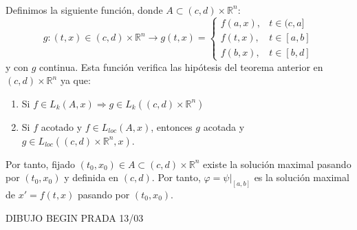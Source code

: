 \documentclass{article}
\makeatletter
\theoremstyle{theorem-style}  %
\theoremstyle{definition-style}
\theoremstyle{example-style}
\renewenvironment{proof}[1][\proofname]{\par
	\pushQED{\qed}%
	\normalfont \topsep6\p@\@plus6\p@\relax
	\list{}{%
		\settowidth{\leftmargin}{\quad:\hskip\labelsep}%
		\setlength{\labelwidth}{0pt}%
		\setlength{\itemindent}{-\leftmargin}%
	}%
	\item[\hskip\labelsep\itshape#1\@addpunct{:}]\ignorespaces
}{%
	\popQED\endlist\@endpefalse
}
\makeatother
\begin{document}
\begin{proof}\ \\
	Definimos la siguiente función, donde $A \subset (c, d) \times \mathbb{R}^n$:
	\[g: (t, x) \in (c, d) \times \mathbb{R}^n \longrightarrow g(t, x) = \begin{cases}
	f(a, x), &t \in (c, a] \\
	f(t, x), &t \in [a, b] \\
	f(b, x), &t \in [b, d] 
	\end{cases}\]
	y con $g$ continua. Esta función verifica las hipótesis del teorema anterior en $(c, d) \times \mathbb{R}^n$ ya que:
	\begin{enumerate}[-]
		\item Si $f \in L_k(A, x) \Rightarrow g \in L_k ((c, d) \times \mathbb{R}^n)$
		\item Si $f$ acotado y $f \in L_{loc} (A, x)$, entonces $g$ acotada y $g \in L_{loc} ((c, d) \times \mathbb{R}^n, x)$.
	\end{enumerate}
	Por tanto, fijado $(t_0, x_0) \in A \subset (c, d) \times \mathbb{R}^n$ existe la solución maximal pasando por $(t_0, x_0)$ y definida en $(c, d)$. Por tanto, $\varphi = \psi|_{[a, b]}$ es la solución maximal de $x' = f(t, x)$ pasando por $(t_0, x_0)$.
	
	DIBUJO
	\end{proof}
BEGIN PRADA 13/03
\end{document}
